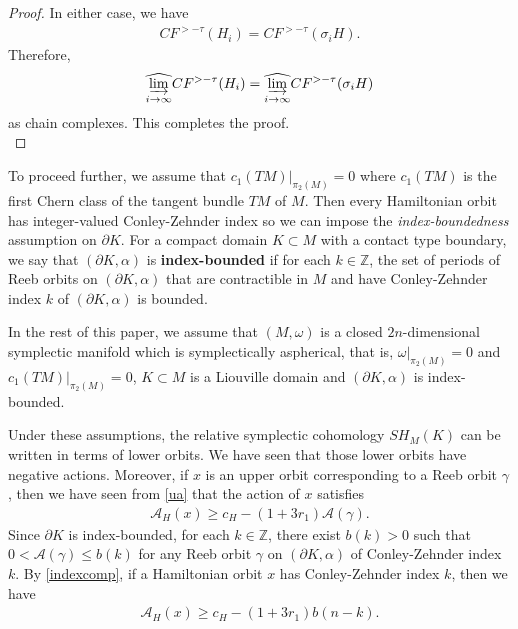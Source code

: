 \documentclass[12pt]{amsart}
\theoremstyle{definition}
\newcommand{\ZZ}{{\mathbb Z}}
\begin{document}
\begin{proof}
\vspace{0.2cm}

In either case, we have
\begin{align*}
    CF^{>-\tau}(H_i) = CF^{>-\tau}(\sigma_iH).
\end{align*}
Therefore,
\begin{align*}
    \widehat{\varinjlim_{i \to \infty}}CF^{>-\tau}(H_i) = \widehat{\varinjlim_{i \to \infty}}  CF^{>-\tau}(\sigma_iH)
\end{align*}
as chain complexes. This completes the proof.\\
\end{proof}

To proceed further, we assume that $c_1(TM)|_{\pi_2(M)} = 0$ where $c_1(TM)$ is the first Chern class of the tangent bundle $TM$ of $M$. Then every Hamiltonian orbit has integer-valued Conley-Zehnder index so we can impose the \textit{index-boundedness} assumption on $\partial K$. For a compact domain $K \subset M$ with a contact type boundary, we say that $(\partial K, \alpha)$ is \textbf{index-bounded} if for each $k\in\ZZ$, the set of periods of Reeb orbits on $(\partial K, \alpha)$ that are contractible in $M$ and have Conley-Zehnder index $k$ of $(\partial K, \alpha)$ is bounded.

\vspace{0.2 cm}

 In the rest of this paper, we assume that $(M,\omega)$ is a closed $2n$-dimensional symplectic manifold which is symplectically aspherical, that is, $\omega|_{\pi_2(M)}=0$ and $c_1(TM)|_{\pi_2(M)}=0$, $K \subset M$ is a Liouville domain and $(\partial K, \alpha)$ is index-bounded.

\vspace{0.2cm}

Under these assumptions, the relative symplectic cohomology $SH_M(K)$ can be written in terms of lower orbits. We have seen that those lower orbits have negative actions. Moreover, if $x$ is an upper orbit corresponding to a Reeb orbit $\gamma$, then we have seen from \eqref{ua} that the action of $x$ satisfies 
\begin{align*}
    \mathcal{A}_H(x) \geq c_H - (1+3r_1) \mathcal{A}(\gamma).
\end{align*}
Since $\partial K$ is index-bounded, for each $k\in\ZZ$, there exist $b(k)>0$ such that $0< \mathcal{A}(\gamma) \leq b(k)$ for any Reeb orbit $\gamma$ on $(\partial K, \alpha)$ of Conley-Zehnder index $k$. By \eqref{indexcomp}, if a Hamiltonian orbit $x$ has Conley-Zehnder index $k$, then we have
\begin{align*}
    \mathcal{A}_H(x) \geq c_H - (1+3r_1) b(n-k).
\end{align*}
\end{document}
